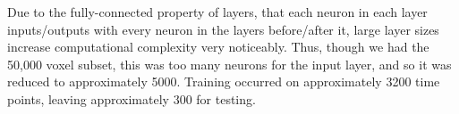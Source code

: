 \par Due to the fully-connected property of layers, that each neuron in each layer inputs/outputs with every neuron in the layers before/after it, large layer sizes increase computational complexity very noticeably. Thus, though we had the 50,000 voxel subset, this was too many neurons for the input layer, and so it was reduced to approximately 5000. Training occurred on approximately 3200 time points, leaving approximately 300 for testing.









